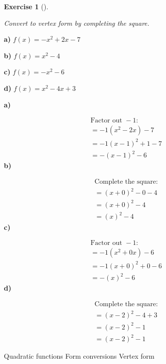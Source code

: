 \documentclass[
  letterpaper,
  DIV=11,
  numbers=noendperiod]{scrreprt}
\theoremstyle{definition}
\newtheorem{exercise}{Exercise}[chapter]
\theoremstyle{remark}
\begin{document}
\begin{exercise}[]\protect\hypertarget{exr-u7-23}{}\label{exr-u7-23}

\emph{Convert to vertex form by completing the square.}

\textbf{a)} \(\displaystyle f(x) = -x^2 + 2x - 7\)

\textbf{b)} \(\displaystyle f(x) = x^2 - 4\)

\textbf{c)} \(\displaystyle f(x) = -x^2 - 6\)

\textbf{d)} \(\displaystyle f(x) = x^2 - 4x + 3\)

\begin{tcolorbox}[enhanced jigsaw, opacitybacktitle=0.6, coltitle=black, arc=.35mm, colframe=quarto-callout-tip-color-frame, colback=white, bottomrule=.15mm, left=2mm, colbacktitle=quarto-callout-tip-color!10!white, titlerule=0mm, opacityback=0, title=\textcolor{quarto-callout-tip-color}{\faLightbulb}\hspace{0.5em}{🔍 View Solutions}, leftrule=.75mm, breakable, rightrule=.15mm, bottomtitle=1mm, toptitle=1mm, toprule=.15mm]

\textbf{a)}

\[
\begin{aligned}
\text{Factor out } -1\text{:} \\[4pt] = -1\left(x^2 - 2x\right) - 7 \\[4pt] = -1\left(x - 1\right)^2 + 1 - 7 \\[4pt] = -(x - 1)^2 - 6
\end{aligned}
\] \textbf{b)}

\[
\begin{aligned}
\text{Complete the square:} \\[4pt] = (x + 0)^2 - 0 - 4 \\[4pt] = (x + 0)^2 - 4 \\[4pt] = (x)^2 - 4
\end{aligned}
\] \textbf{c)}

\[
\begin{aligned}
\text{Factor out } -1\text{:} \\[4pt] = -1\left(x^2 + 0x\right) - 6 \\[4pt] = -1\left(x + 0\right)^2 + 0 - 6 \\[4pt] = -(x)^2 - 6
\end{aligned}
\] \textbf{d)}

\[
\begin{aligned}
\text{Complete the square:} \\[4pt] = (x - 2)^2 - 4 + 3 \\[4pt] = (x - 2)^2 - 1 \\[4pt] = (x - 2)^2 - 1
\end{aligned}
\]

\end{tcolorbox}

{Quadratic functions} {Form conversions} {Vertex form}

\end{exercise}
\end{document}
